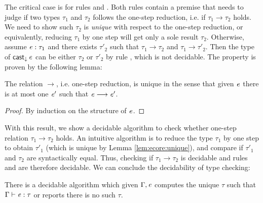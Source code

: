 The critical case is for rules  and . Both rules contain a premise that needs to judge if two types $\tau_{{\mathrm{1}}}$ and $\tau_{{\mathrm{2}}}$ follows the one-step reduction, i.e. if $\tau_{{\mathrm{1}}}  \longrightarrow  \tau_{{\mathrm{2}}}$ holds. We need to show such $\tau_{{\mathrm{2}}}$ is \emph{unique} with respect to the one-step reduction, or equivalently, reducing $\tau_{{\mathrm{1}}}$ by one step will get only a sole result $\tau_{{\mathrm{2}}}$. Otherwise, assume $\mathit{e}:\tau_{{\mathrm{1}}}$ and there exists $\tau'_{{\mathrm{2}}}$ such that $\tau_{{\mathrm{1}}}  \longrightarrow  \tau_{{\mathrm{2}}}$ and $\tau_{{\mathrm{1}}}  \longrightarrow  \tau'_{{\mathrm{2}}}$. Then the type of $\mathsf{cast}_{\downarrow} \, \mathit{e}$ can be either $\tau_{{\mathrm{2}}}$ or $\tau'_{{\mathrm{2}}}$ by rule , which is not decidable. The property is proven by the following lemma:

\begin{lem}\label{lem:ecore:unique}
	The relation $ \longrightarrow $, i.e. one-step reduction, is unique in the sense that given $\mathit{e}$ there is at most one $\mathit{e'}$ such that $\mathit{e}  \longrightarrow  \mathit{e'}$.
\end{lem}

\begin{proof}
	By induction on the structure of $\mathit{e}$.
\end{proof}

With this result, we show a decidable algorithm to check whether one-step relation $\tau_{{\mathrm{1}}}  \longrightarrow  \tau_{{\mathrm{2}}}$ holds. An intuitive algorithm is to reduce the type $\tau_{{\mathrm{1}}}$ by one step to obtain $\tau'_{{\mathrm{1}}}$ (which is unique by Lemma \ref{lem:ecore:unique}), and compare if $\tau'_{{\mathrm{1}}}$ and $\tau_{{\mathrm{2}}}$ are syntactically equal. Thus, checking if $\tau_{{\mathrm{1}}}  \longrightarrow  \tau_{{\mathrm{2}}}$ is decidable and rules  and  are therefore decidable. We can conclude the decidability of type checking:

\begin{lem}\label{lem:ecore:decide}
	There is a decidable algorithm which given $\Gamma, \mathit{e}$ computes the unique $\tau$ such that $\Gamma  \vdash  \mathit{e}  :  \tau$ or reports there is no such $\tau$.
\end{lem}

